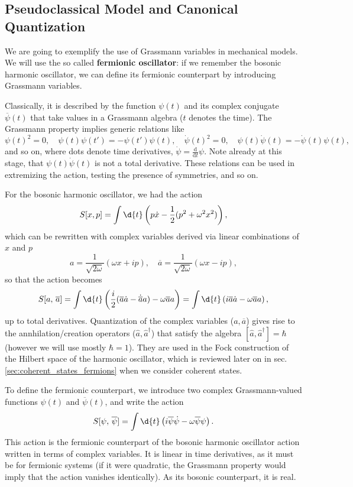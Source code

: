 \subsection{Pseudoclassical Model and Canonical Quantization}

We are going to exemplify the use of Grassmann variables in mechanical models. We will use the so called \textbf{fermionic oscillator}: if we remember the bosonic harmonic oscillator, we can define its fermionic counterpart by introducing Grassmann variables.

Classically, it is described by the function \(\psi(t)\) and its complex conjugate \(\overline{\psi}(t)\) that take values in a Grassmann algebra (\(t\) denotes the time). The Grassmann property implies generic relations like
\[
    \psi(t)^2 = 0, \quad \psi(t) \psi(t') = - \psi(t') \psi(t), \quad \dot{\psi}(t)^2 = 0, \quad \psi(t) \dot{\psi}(t) = - \dot{\psi}(t) \psi(t),
\]
and so on, where dots denote time derivatives, \(\dot{\psi} = \frac{\mathrm{d}}{\mathrm{d}t} \psi\). Note already at this stage, that \(\psi(t) \dot{\psi}(t)\) is not a total derivative. These relations can be used in extremizing the action, testing the presence of symmetries, and so on.

For the bosonic harmonic oscillator, we had the action
\[
    S[x,p] = \int \d{t} \left( p \dot{x} - \frac{1}{2} (p^2 + \omega^2 x^2) \right),
\]
which can be rewritten with complex variables derived via linear combinations of \(x\) and \(p\)
\[
    a = \frac{1}{\sqrt{2 \omega}} (\omega x + i p), \quad \overline{a} = \frac{1}{\sqrt{2 \omega}} (\omega x - i p),
\]
so that the action becomes
\[
    S[a,\,\overline{a}] = \int \d{t} \left( \frac{i}{2}(\overline{a} \dot{a} - \dot{\overline{a}} a) - \omega \overline{a}a \right) = \int \d{t} \left( i \overline{a} \dot{a} - \omega \overline{a} a \right),
\]
up to total derivatives. Quantization of the complex variables (\(a, \overline{a}\)) gives rise to the annhilation/creation operators (\(\hat{a}, \hat{a}^\dagger\)) that satisfy the algebra \([\hat{a}, \hat{a}^\dagger] = \hbar\) (however we will use mostly \(\hbar = 1\)). They are used in the Fock construction of the Hilbert space of the harmonic oscillator, which is reviewed later on in sec. \ref{sec:coherent_states_fermions} when we consider coherent states.

To define the fermionic counterpart, we introduce two complex Grassmann-valued functions \(\psi(t)\) and \(\overline{\psi}(t)\), and write the action
\begin{equation}
    S[\psi,\,\overline{\psi}] = \int \d{t} \left( i \overline{\psi} \dot{\psi} - \omega \overline{\psi} \psi \right).
    \label{eq:fermionic_oscillator_action}
\end{equation}
This action is the fermionic counterpart of the bosonic harmonic oscillator action written in terms of complex variables. It is linear in time derivatives, as it must be for fermionic systems (if it were quadratic, the Grassmann property would imply that the action vanishes identically). As its bosonic counterpart, it is real.


